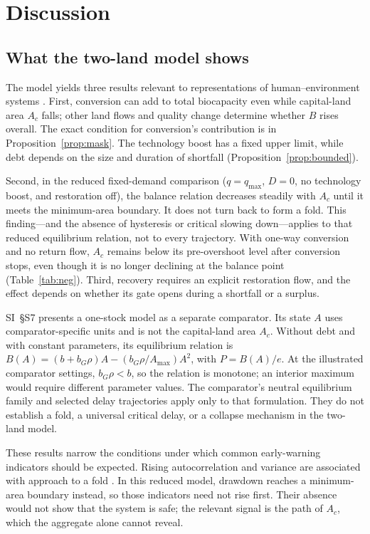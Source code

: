 \documentclass[preprint,12pt,authoryear]{elsarticle}
\begin{document}
\section{Discussion}\label{sec:discussion}

\subsection{What the two-land model shows}

The model yields three results relevant to representations of human--environment systems \citep{Schaefer1954,May1973,Meadows1972,Meadows2004,WackernagelRees1996,BranderTaylor1998}. First, conversion can add to total biocapacity even while capital-land area $A_c$ falls; other land flows and quality change determine whether $B$ rises overall. The exact condition for conversion's contribution is in Proposition~\ref{prop:mask}. The technology boost has a fixed upper limit, while debt depends on the size and duration of shortfall (Proposition~\ref{prop:bounded}).

Second, in the reduced fixed-demand comparison ($q=q_{\max}$, $D=0$, no technology boost, and restoration off), the balance relation decreases steadily with $A_c$ until it meets the minimum-area boundary. It does not turn back to form a fold. This finding—and the absence of hysteresis or critical slowing down—applies to that reduced equilibrium relation, not to every trajectory. With one-way conversion and no return flow, $A_c$ remains below its pre-overshoot level after conversion stops, even though it is no longer declining at the balance point (Table~\ref{tab:neg}). Third, recovery requires an explicit restoration flow, and the effect depends on whether its gate opens during a shortfall or a surplus.

SI~\S S7 presents a one-stock model as a separate comparator. Its state $A$ uses comparator-specific units and is not the capital-land area $A_c$. Without debt and with constant parameters, its equilibrium relation is $B(A)=(b+b_G\rho)A-(b_G\rho/A_{\max})A^2$, with $P=B(A)/e$. At the illustrated comparator settings, $b_G\rho<b$, so the relation is monotone; an interior maximum would require different parameter values. The comparator's neutral equilibrium family and selected delay trajectories apply only to that formulation. They do not establish a fold, a universal critical delay, or a collapse mechanism in the two-land model.

These results narrow the conditions under which common early-warning indicators should be expected. Rising autocorrelation and variance are associated with approach to a fold \citep{Scheffer2001}. In this reduced model, drawdown reaches a minimum-area boundary instead, so those indicators need not rise first. Their absence would not show that the system is safe; the relevant signal is the path of $A_c$, which the aggregate alone cannot reveal.
\end{document}
